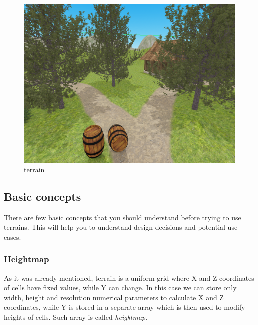 \documentclass[
]{book}
\theoremstyle{definition}
\theoremstyle{definition}
\theoremstyle{definition}
\theoremstyle{definition}
\theoremstyle{remark}
\begin{document}
\begin{figure}
\centering
\includegraphics{images/scene_terrain.png}
\caption{terrain}
\end{figure}

\subsection{Basic concepts}\label{basic-concepts-2}

There are few basic concepts that you should understand before trying to use terrains. This will help you to understand design decisions and potential use cases.

\subsubsection{Heightmap}\label{heightmap}

As it was already mentioned, terrain is a uniform grid where X and Z coordinates of cells have fixed values, while Y can change. In this case we can store only width, height and resolution numerical parameters to calculate X and Z coordinates, while Y is stored in a separate array which is then used to modify heights of cells. Such array is called \emph{heightmap}.
\end{document}

